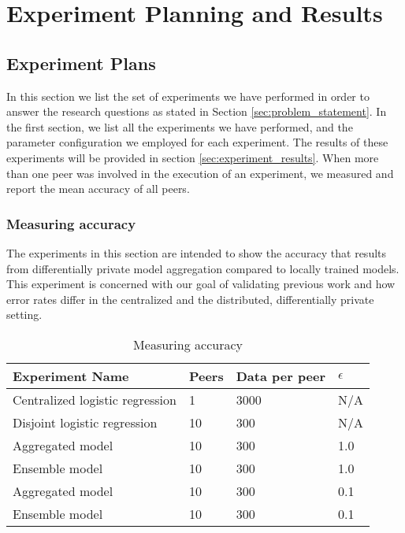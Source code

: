 
\chapter{Experiment Planning and Results}
\label{ch:experiments_and_results}

\section{Experiment Plans}
\label{sec:experiment_plan}

In this section we list the set of experiments we have performed in order to answer the research questions as stated in Section \ref{sec:problem_statement}. In the first section, we list all the experiments we have performed, and the parameter configuration we employed for each experiment. The results of these experiments will be provided in section \ref{sec:experiment_results}. When more than one peer was involved in the execution of an experiment, we measured and report the mean accuracy of all peers.


\subsection{Measuring accuracy}
\label{sec:experiment_measuring_accuracy}
The experiments in this section are intended to show the accuracy that results from differentially private model aggregation compared to locally trained models. This experiment is concerned with our goal of validating previous work and how error rates differ in the centralized and the distributed, differentially private setting.

\begin{table}[h]
	\centering
	\begin{tabular}{|l|l|l|l|}
		{\bf Experiment Name}           & {\bf Peers} & {\bf Data per peer} & {\bf $\epsilon$} \\
		\hline
		Centralized logistic regression & 1           & 3000       & N/A              \\	
		Disjoint logistic regression    & 10          & 300        & N/A              \\
		Aggregated model                & 10          & 300        & 1.0              \\
		Ensemble model                  & 10          & 300        & 1.0              \\
		Aggregated model                & 10          & 300        & 0.1              \\
		Ensemble model  & 10    & 300        & 0.1             
	\end{tabular}
	\caption{Measuring accuracy}
	\label{tab:experiment_accuracy_measuring}
\end{table}

